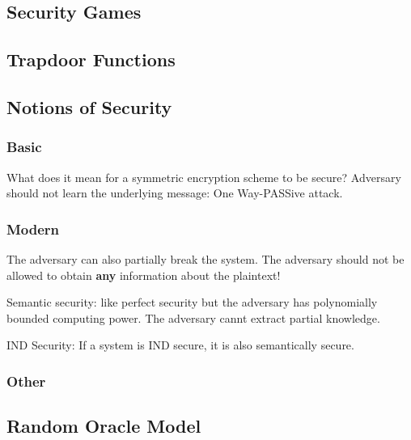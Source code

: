 \subsection{Security Games}

\subsection{Trapdoor Functions}

\subsection{Notions of Security}
\subsubsection{Basic}
What does it mean for a symmetric encryption scheme to be secure? Adversary should not learn the underlying message: One Way-PASSive attack.

\subsubsection{Modern}
The adversary can also partially break the system. The adversary should not be allowed to obtain \textbf{any} information about the plaintext!

\begin{defn}
Semantic security: like perfect security but the adversary has polynomially bounded computing power. The adversary cannt extract partial knowledge. 
\end{defn}


\begin{defn}
IND Security: If a system is IND secure, it is also semantically secure.
\end{defn}
\subsubsection{Other}
\subsection{Random Oracle Model}